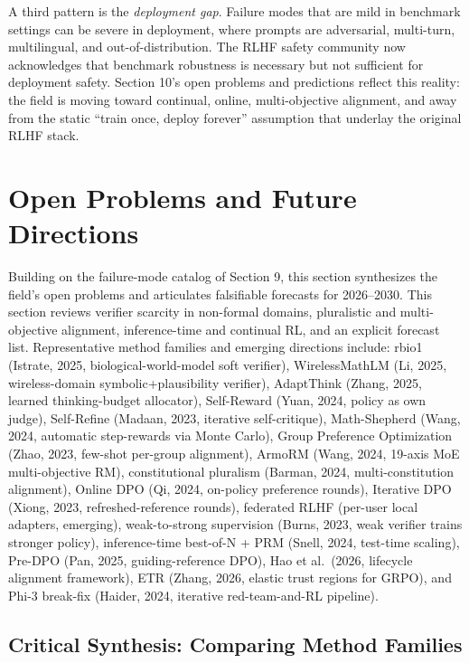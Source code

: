 \documentclass{article}
\begin{document}
A third pattern is the \emph{deployment gap}. Failure modes that are mild in benchmark settings can be severe in deployment, where prompts are adversarial, multi-turn, multilingual, and out-of-distribution. The RLHF safety community now acknowledges that benchmark robustness is necessary but not sufficient for deployment safety. Section 10's open problems and predictions reflect this reality: the field is moving toward continual, online, multi-objective alignment, and away from the static ``train once, deploy forever'' assumption that underlay the original RLHF stack.

\section{Open Problems and Future Directions}\label{open-problems-and-future-directions}

Building on the failure-mode catalog of Section 9, this section synthesizes the field's open problems and articulates falsifiable forecasts for 2026--2030. This section reviews verifier scarcity in non-formal domains, pluralistic and multi-objective alignment, inference-time and continual RL, and an explicit forecast list. Representative method families and emerging directions include: rbio1 (Istrate, 2025, biological-world-model soft verifier), WirelessMathLM (Li, 2025, wireless-domain symbolic+plausibility verifier), AdaptThink (Zhang, 2025, learned thinking-budget allocator), Self-Reward (Yuan, 2024, policy as own judge), Self-Refine (Madaan, 2023, iterative self-critique), Math-Shepherd (Wang, 2024, automatic step-rewards via Monte Carlo), Group Preference Optimization (Zhao, 2023, few-shot per-group alignment), ArmoRM (Wang, 2024, 19-axis MoE multi-objective RM), constitutional pluralism (Barman, 2024, multi-constitution alignment), Online DPO (Qi, 2024, on-policy preference rounds), Iterative DPO (Xiong, 2023, refreshed-reference rounds), federated RLHF (per-user local adapters, emerging), weak-to-strong supervision (Burns, 2023, weak verifier trains stronger policy), inference-time best-of-N + PRM (Snell, 2024, test-time scaling), Pre-DPO (Pan, 2025, guiding-reference DPO), Hao et al.~(2026, lifecycle alignment framework), ETR (Zhang, 2026, elastic trust regions for GRPO), and Phi-3 break-fix (Haider, 2024, iterative red-team-and-RL pipeline).

\subsection{Critical Synthesis: Comparing Method Families}\label{critical-synthesis-comparing-method-families}
\end{document}
